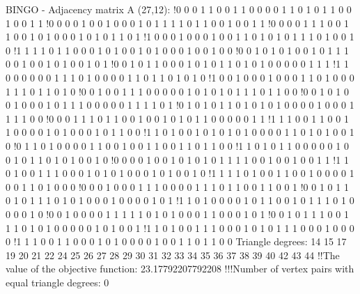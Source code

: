 BINGO - Adjacency matrix A (27,12):
!0 0 0 1 1 0 0 1 1 0 0 0 0 1 1 0 1 0 1 1 0 0 1 0 0 1 1
!0 0 0 0 1 0 0 1 0 0 0 1 0 1 1 1 1 0 1 1 0 0 1 0 0 1 1
!0 0 0 0 1 1 1 0 0 1 1 0 0 1 0 1 0 0 0 1 0 1 0 1 1 0 1
!1 0 0 0 1 0 0 0 1 0 0 1 1 0 1 0 1 0 1 1 1 0 1 0 0 1 0
!1 1 1 1 0 1 1 0 0 0 1 0 1 0 0 1 0 1 0 0 0 1 0 0 1 0 0
!0 0 1 0 1 0 1 0 0 1 0 1 1 1 0 0 1 0 0 1 0 1 0 0 1 0 1
!0 0 1 0 1 1 0 0 0 1 0 1 0 1 1 0 1 0 1 0 0 0 0 0 1 1 1
!1 1 0 0 0 0 0 0 1 1 1 0 1 0 0 0 0 1 1 0 1 1 0 1 0 1 0
!1 0 0 1 0 0 0 1 0 0 0 1 1 0 1 0 0 0 1 1 1 0 1 1 0 1 0
!0 0 1 0 0 1 1 1 0 0 0 0 0 1 0 1 0 1 0 1 1 1 0 1 1 0 0
!0 0 1 0 1 0 0 1 0 0 0 1 0 1 1 1 0 0 0 0 0 1 1 1 1 0 1
!0 1 0 1 0 1 1 0 1 0 1 0 1 0 0 0 0 1 0 0 0 1 1 1 1 0 0
!0 0 0 1 1 1 0 1 1 0 0 1 0 0 1 0 1 0 1 1 0 0 0 0 0 1 1
!1 1 1 0 0 1 1 0 0 1 1 0 0 0 0 1 0 1 0 0 0 1 0 1 1 0 0
!1 1 0 1 0 0 1 0 1 0 1 0 1 0 0 0 0 1 1 0 1 0 1 0 0 1 0
!0 1 1 0 1 0 0 0 0 1 1 0 0 1 0 0 1 1 0 0 1 1 0 1 1 0 0
!1 1 0 1 0 1 1 0 0 0 0 0 1 0 0 1 0 1 1 0 1 0 1 0 0 1 0
!0 0 0 0 1 0 0 1 0 1 0 1 0 1 1 1 1 0 0 1 0 0 1 0 0 1 1
!1 1 0 1 0 0 1 1 1 0 0 0 1 0 1 0 1 0 0 0 1 0 1 0 0 1 0
!1 1 1 1 0 1 0 0 1 1 0 0 1 0 0 0 0 1 0 0 1 1 0 1 0 0 0
!0 0 0 1 0 0 0 1 1 1 0 0 0 0 1 1 1 0 1 1 0 0 1 1 0 0 1
!0 0 1 0 1 1 0 1 0 1 1 1 0 1 0 1 0 0 0 1 0 0 0 0 1 0 1
!1 1 0 1 0 0 0 0 1 0 1 1 0 0 1 0 1 1 1 0 1 0 0 0 0 1 0
!0 0 1 0 0 0 0 1 1 1 1 1 0 1 0 1 0 0 0 1 1 0 0 0 1 0 1
!0 0 1 0 1 1 1 0 0 1 1 1 0 1 0 1 0 0 0 0 0 1 0 1 0 0 1
!1 1 0 1 0 0 1 1 1 0 0 0 1 0 1 0 1 1 1 0 0 0 1 0 0 0 0
!1 1 1 0 0 1 1 0 0 0 1 0 1 0 0 0 0 1 0 0 1 1 0 1 1 0 0
Triangle degrees:
14 15 17 19 20 21 22 24 25 26 27 28 29 30 31 32 33 34 35 36 37 38 39 40 42 43 44
!!The value of the objective function: 23.17792207792208
!!!Number of vertex pairs with equal triangle degrees: 0

